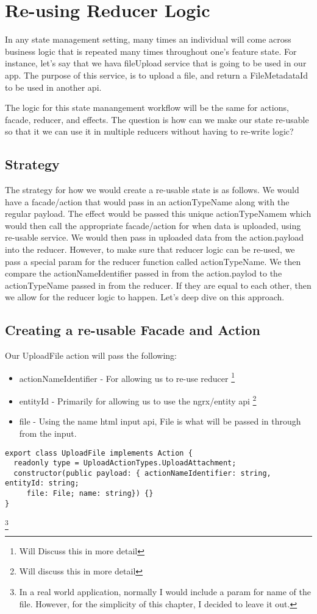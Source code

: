 
\chapter{ Re-using Reducer Logic }

In any state management setting, many times an individual will come across
business logic that is repeated many times throughout one's feature state. For
instance, let's say that we hava fileUpload service that is going to be used in
our app. The purpose of this service, is to upload a file, and return a
FileMetadataId to be used in another api.

The logic for this state manangement workflow will be the same for actions,
facade, reducer, and effects. The question is how can we make our state
re-usable so that it we can use it in multiple reducers without having to
re-write logic?

\section{ Strategy }

The strategy for how we would create a re-usable state is as follows. We would
have a facade/action that would pass in an actionTypeName along with the
regular payload. The effect would be passed this unique actionTypeNamem which
would then call the appropriate facade/action for when data is uploaded, using
re-usable service. We would then pass in uploaded data from the action.payload
into the reducer. However, to make sure that reducer logic can be re-used, we
pass a special param for the reducer function called actionTypeName. We then
compare the actionNameIdentifier passed in from the action.paylod to the
actionTypeName passed in from the reducer. If they are equal to each other, then
we allow for the reducer logic to happen. Let's deep dive on this approach.

\section{Creating a re-usable Facade and Action}
Our UploadFile action will pass the following:
\begin{itemize}
  \item actionNameIdentifier - For allowing us to re-use reducer
  \footnote{Will Discuss this in more detail}
  \item entityId - Primarily for allowing us to use the ngrx/entity api
  \footnote{Will discuss this in more detail}
  \item file - Using the name html input api, File is what will be passed in
  through from the input.
\end{itemize}
\begin{lstlisting}
export class UploadFile implements Action {
  readonly type = UploadActionTypes.UploadAttachment;
  constructor(public payload: { actionNameIdentifier: string, entityId: string;
     file: File; name: string}) {}
}
\end{lstlisting}
\footnote{In a real world application, normally I would include a param for name
of the file. However, for the simplicity of this chapter, I decided to leave
it out.}

